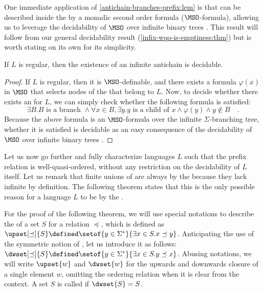 One immediate application of \cref{antichain-branches-prefix:lem} is
that  can be described inside the 
by a monadic second order formula ($\MSO$-formula), allowing us to
leverage the decidability of $\MSO$ over infinite binary trees \cite[Theorem
1.1]{RAB69}. This result will follow from our general decidability result
(\cref{infix-wqo-is-emptiness:thm}) but is worth stating on its own for its
simplicity.

\begin{corollary}
    \label{prefix-wqo-reg-decidable:cor}
    If $L$ is regular, then the existence of an infinite antichain is decidable.
\end{corollary}
\begin{proof}
    If $L$ is regular, then it is $\MSO$-definable, and there 
    exists a formula $\varphi(x)$ in $\MSO$ that selects nodes 
    of the  that belong to $L$. Now, to decide whether there
    exists an  for $L$, we can simply check whether
    the following formula is satisfied:
    \begin{equation*}
        \exists B. 
        B \text{ is a branch } \land
        \forall x \in B, \exists y. y \text{ is a child of } x \land \varphi(y) \land y \not\in B
        \quad .
    \end{equation*}
    Because the above formula is an $\MSO$-formula over the infinite
    $\Sigma$-branching tree, whether it is satisfied is decidable
    as an easy consequence of the decidability of $\MSO$ over infinite binary
    trees
    \cite[Theorem 1.1]{RAB69}.
\end{proof}

Let us now go further and fully characterize languages $L$ such that the
prefix relation is well-quasi-ordered, without any restriction on the
decidability of $L$ itself. Let us remark that finite unions of  are
always  by the  because they lack
infinite  by definition. The following theorem states that this
is the only possible reason for a language $L$ to be  by
the .

For the proof of the following theorem, we will use special notations to
describe the  of a set $S$ for a relation $\preceq$,
which is defined as $\upset[\preceq]{S} \defined \setof{y \in \Sigma^*}{
\exists x \in S. x \preceq y}$. Anticipating the use of the symmetric notion of
, let us introduce it as follows: $\dwset[\preceq]{S} \defined \setof{y
\in \Sigma^*}{ \exists x \in S. y \preceq x}$. Abusing notations, we will
write $\upset{w}$ and $\dwset{w}$ for the upwards and downwards closure of a
single element $w$, omitting the ordering relation when it is clear from the
context. A set $S$ is called  if $\dwset{S} = S$.

